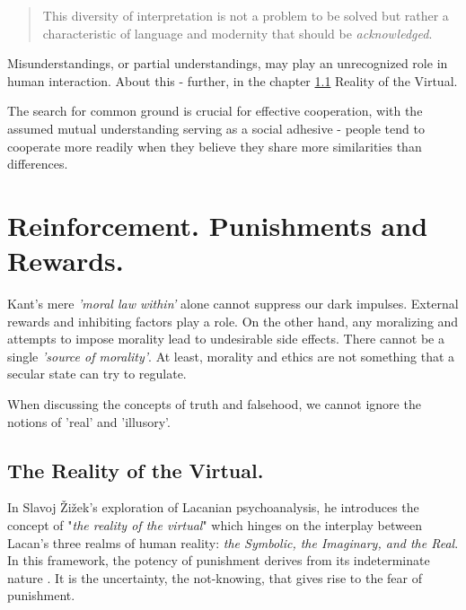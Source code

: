 \documentclass[11pt,a4]{article}
\begin{document}
        \begin{quote}
            This diversity of interpretation is not a problem to be solved
            but rather a characteristic of language and modernity that
            should be \textit{acknowledged}.
        \end{quote}


        Misunderstandings, or partial understandings, may play an
        unrecognized role in human interaction.
        About this - further, in the chapter \ref{reality} Reality of the Virtual.

        The search for common ground is crucial for
        effective cooperation, with the assumed mutual understanding
        serving as a social adhesive - people tend to cooperate more readily
        when they believe they share more similarities than differences.









\newpage
\section{Reinforcement. Punishments and Rewards.}

Kant's mere \textit{'moral law within'} alone cannot suppress our
dark impulses. External rewards and inhibiting factors play a role.
On the other hand,  any moralizing and attempts to impose morality
lead to undesirable side effects. There cannot be
a single \textit{'source of morality'}.
At least, morality and ethics are not something that a
secular state can try to regulate.

When discussing the concepts of truth and falsehood, we cannot
ignore the notions of 'real' and 'illusory'.


    \subsection{The Reality of the Virtual.} \label{reality}

        In Slavoj Žižek's exploration of Lacanian psychoanalysis, he introduces
        the concept of "\textit{the reality of the virtual}" which hinges on the interplay between
        Lacan's three realms of human reality: \textit{the Symbolic, the Imaginary, and the Real}\cite{lacan1981four}.
        In this framework, the potency of punishment derives from its indeterminate
        nature \cite{Borretzen2012-tx}. It is the uncertainty, the not-knowing, that gives rise
        to the fear of punishment.
\end{document}
